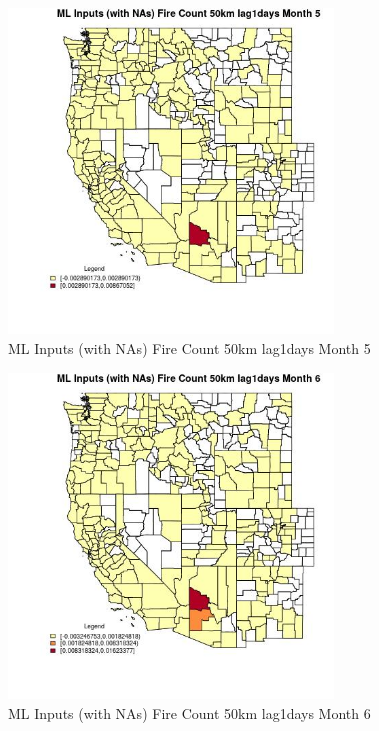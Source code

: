 \begin{figure} 
\centering  
\includegraphics[width=0.77\textwidth]{Code_Outputs/Report_ML_input_PM25_Step4_part_e_de_duplicated_aves_compiled_2019-05-20wNAs_CountyFire_Count_50km_lag1daysmedianMonth5.jpg} 
\caption{\label{fig:Report_ML_input_PM25_Step4_part_e_de_duplicated_aves_compiled_2019-05-20wNAsCountyFire_Count_50km_lag1daysmedianMonth5}ML Inputs (with NAs) Fire Count 50km lag1days Month 5} 
\end{figure} 
 

\begin{figure} 
\centering  
\includegraphics[width=0.77\textwidth]{Code_Outputs/Report_ML_input_PM25_Step4_part_e_de_duplicated_aves_compiled_2019-05-20wNAs_CountyFire_Count_50km_lag1daysmedianMonth6.jpg} 
\caption{\label{fig:Report_ML_input_PM25_Step4_part_e_de_duplicated_aves_compiled_2019-05-20wNAsCountyFire_Count_50km_lag1daysmedianMonth6}ML Inputs (with NAs) Fire Count 50km lag1days Month 6} 
\end{figure} 
 

